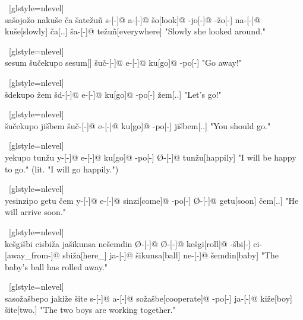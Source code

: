 \ex~[glstyle=nlevel]
\begingl
\glpreamble {} \\ sa\v{s}ojo\v{z}o naku\v{s}e \v{c}a \v{s}ate\v{z}uñ
\endpreamble
s-[{\Ind}-]@
a-[{\Prog}-]@
\v{s}o[look]@
-jo[-{\Hg}]@
-\v{z}o[-{\Inan}]
na-[{\Prog}-]@
ku\v{s}e[slowly]
\v{c}a[{\T}.{\Hg}.{\Erg}]
\v{s}a-[{\Acc}-]@
te\v{z}uñ[everywhere]
\glft "Slowly she looked around."
\endgl
\xe

\ex~[glstyle=nlevel]
\begingl
\glpreamble {} \\ sesum \v{s}u\v{c}ekupo
\endpreamble
sesum[\Imp]
\v{s}u\v{c}-[{\Deo}-]@
e-[{\Pfv}-]@
ku[go]@
-po[-{\Hg}]
\glft "Go away!"
\endgl
\xe

\ex~[glstyle=nlevel]
\begingl
\glpreamble {} \\ \v{s}dekupo \v{z}em
\endpreamble
\v{s}d-[{\Opt}-]@
e-[{\Pfv}-]@
ku[go]@
-po[-{\Hg}]
\v{z}em[{\Fin}.{\Hg}.{\Nom}]
\glft "Let's go!"
\endgl
\xe

\ex~[glstyle=nlevel]
\begingl
\glpreamble {} \\ \v{s}u\v{c}ekupo ji\v{s}bem
\endpreamble
\v{s}u\v{c}-[{\Deo}-]@
e-[{\Pfv}-]@
ku[go]@
-po[-{\Hg}]
ji\v{s}bem[{\Spol}.{\Hg}.{\Nom}]
\glft "You should go."
\endgl
\xe

\ex~[glstyle=nlevel]
\begingl
\glpreamble {} \\ yekupo tun\v{z}u
\endpreamble
y-[{\Subj}-]@
e-[{\Pfv}-]@
ku[go]@
-po[-{\Hg}]
Ø-[{\Pfv}-]@
tun\v{z}u[happily]
\glft "I will be happy to go." (lit. "I will go happily.")
\endgl
\xe

\ex~[glstyle=nlevel]
\begingl
\glpreamble {} \\ yesinzipo getu \v{c}em
\endpreamble
y-[{\Subj}-]@
e-[{\Pfv}-]@
sinzi[come]@
-po[-{\Hg}]
Ø-[{\Pfv}-]@
getu[soon]
\v{c}em[{\T}.{\Hg}.{\Nom}]
\glft "He will arrive soon."
\endgl
\xe

\ex~[glstyle=nlevel]
\begingl
\glpreamble {} \\ ke\v{s}gi\v{s}bi cisbi\v{z}a ja\v{s}ikunsa ne\v{s}emdin
\endpreamble
Ø-[{\Ind}-]@
Ø-[{\Pfv}-]@
ke\v{s}gi[roll]@
-\v{s}bi[-{\Inan}]
ci-[away\_from-]@
sbi\v{z}a[here\_{\Prox}]
ja-[{\Nom}-]@
\v{s}ikunsa[ball]
ne-[{\Gen}-]@
\v{s}emdin[baby]
\glft "The baby's ball has rolled away."
\endgl
\xe

\ex~[glstyle=nlevel]
\begingl
\glpreamble {} \\ saso\v{z}a\v{s}bepo jaki\v{z}e \v{s}ite
\endpreamble
s-[{\Ind}-]@
a-[{\Prog}-]@
so\v{z}a\v{s}be[cooperate]@
-po[-{\Hg}]
ja-[{\Nom}-]@
ki\v{z}e[boy]
\v{s}ite[two.{\Hg}]
\glft "The two boys are working together."
\endgl
\xe


\endgroup
\iffalse


\ex~[glstyle=nlevel]
\begingl
\glpreamble \SG{} \\ 
\endpreamble

\glft 
\endgl
\xe


\fi